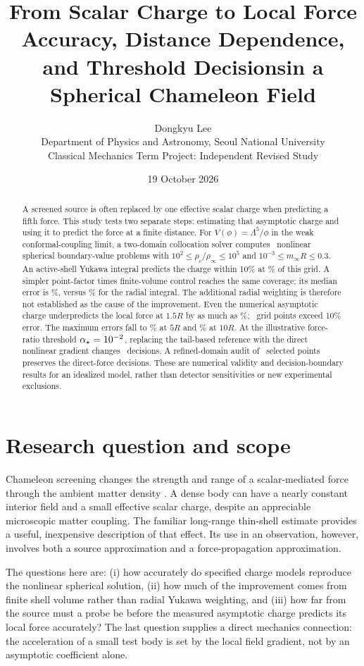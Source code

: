 \documentclass[11pt,a4paper]{article}
\title{\bfseries\Large From Scalar Charge to Local Force\\[4pt]
\large Accuracy, Distance Dependence, and Threshold Decisions\newline in a Spherical Chameleon Field}
\author{Dongkyu Lee\\\small Department of Physics and Astronomy, Seoul National University\\
\small Classical Mechanics Term Project: Independent Revised Study}
\date{19 October 2026}
\begin{document}
\maketitle
\begin{abstract}
A screened source is often replaced by one effective scalar charge when
predicting a fifth force. This study tests two separate steps: estimating that
asymptotic charge and using it to predict the force at a finite distance.
For $V(\phi)=\Lambda^5/\phi$ in the weak conformal-coupling limit, a two-domain
collocation solver computes \StudyPoints\ nonlinear spherical boundary-value
problems with $10^2\leq\rho_c/\rho_\infty\leq10^5$ and
$10^{-3}\leq m_\infty R\leq0.3$. An active-shell Yukawa integral predicts the
charge within 10\% at \StudyASWithin\% of this grid. A simpler point-factor
times finite-volume control reaches the same coverage; its median error is
\StudyPointMedian\%, versus \StudyASMedian\% for the radial integral.
The additional radial weighting is therefore not established as the cause of
the improvement. Even the numerical asymptotic charge underpredicts the local
force at $1.5R$ by as much as \StudyForceNearMax\%; \StudyForceNearFailures\ grid
points exceed 10\% error. The maximum errors fall to \StudyForceFiveMax\%
at $5R$ and \StudyForceTenMax\% at $10R$. At the illustrative force-ratio
threshold $\alpha_\star=10^{-2}$, replacing the tail-based reference
with the direct nonlinear gradient changes \StudyTailFlips\ decisions.
A refined-domain audit of \StudyAuditPoints\ selected points preserves the
direct-force decisions. These are numerical validity and decision-boundary
results for an idealized model, rather than detector sensitivities or new
experimental exclusions.
\end{abstract}

\section{Research question and scope}
Chameleon screening changes the strength and range of a scalar-mediated force
through the ambient matter density \cite{KhouryPRL,KhouryPRD}. A dense body can
have a nearly constant interior field and a small effective scalar charge,
despite an appreciable microscopic matter coupling. The familiar long-range
thin-shell estimate provides a useful, inexpensive description of that effect.
Its use in an observation, however, involves both a source approximation and
a force-propagation approximation.

The questions here are: (i) how accurately do specified charge models reproduce
the nonlinear spherical solution, (ii) how much of the improvement comes from
finite shell volume rather than radial Yukawa weighting, and (iii) how far from
the source must a probe be before the measured asymptotic charge predicts its
local force accurately? The last question supplies a direct mechanics
connection: the acceleration of a small test body is set by the local field
gradient, not by an asymptotic coefficient alone.
\end{document}
